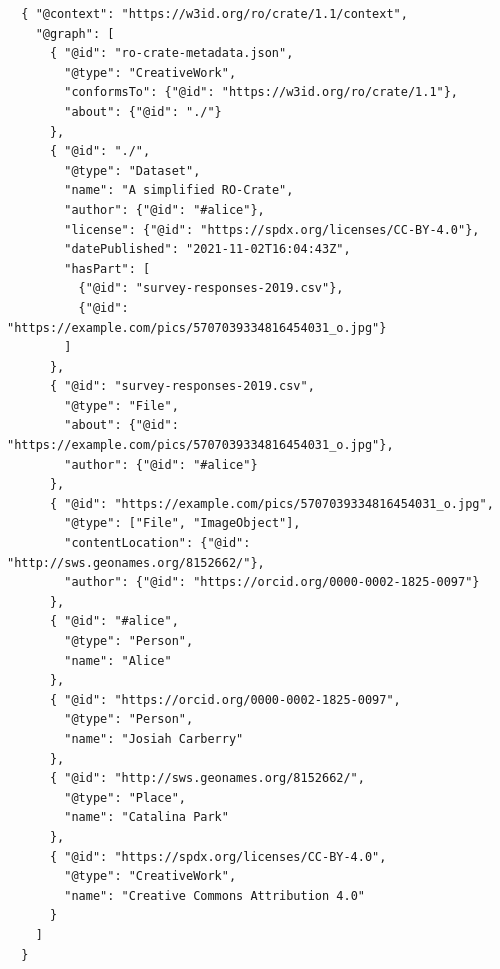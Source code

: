 \begin{listing}
  \footnotesize
  \begin{verbatim}
  { "@context": "https://w3id.org/ro/crate/1.1/context",
    "@graph": [
      { "@id": "ro-crate-metadata.json",      
        "@type": "CreativeWork",
        "conformsTo": {"@id": "https://w3id.org/ro/crate/1.1"},
        "about": {"@id": "./"}
      },
      { "@id": "./",
        "@type": "Dataset",
        "name": "A simplified RO-Crate",
        "author": {"@id": "#alice"},
        "license": {"@id": "https://spdx.org/licenses/CC-BY-4.0"},
        "datePublished": "2021-11-02T16:04:43Z",
        "hasPart": [
          {"@id": "survey-responses-2019.csv"},
          {"@id": "https://example.com/pics/5707039334816454031_o.jpg"}
        ]
      },
      { "@id": "survey-responses-2019.csv",
        "@type": "File",
        "about": {"@id": "https://example.com/pics/5707039334816454031_o.jpg"},
        "author": {"@id": "#alice"}
      },
      { "@id": "https://example.com/pics/5707039334816454031_o.jpg",
        "@type": ["File", "ImageObject"],
        "contentLocation": {"@id": "http://sws.geonames.org/8152662/"},
        "author": {"@id": "https://orcid.org/0000-0002-1825-0097"}
      },
      { "@id": "#alice",
        "@type": "Person",
        "name": "Alice"
      },
      { "@id": "https://orcid.org/0000-0002-1825-0097",
        "@type": "Person",
        "name": "Josiah Carberry"
      },
      { "@id": "http://sws.geonames.org/8152662/",
        "@type": "Place",
        "name": "Catalina Park"
      },
      { "@id": "https://spdx.org/licenses/CC-BY-4.0",
        "@type": "CreativeWork",
        "name": "Creative Commons Attribution 4.0"
      }
    ]
  }    
  \end{verbatim}    
	\caption[Simplified RO-Crate metadata file]{%
  Simplified\footnotemark RO-Crate metadata file showing the
  flattened compacted JSON-LD \texttt{@graph} array containing the data entities
  and contextual entities, cross-referenced using \texttt{@id}. The
  \texttt{ro-crate-metadata.json} entity self-declares conformance with the
  RO-Crate specification using a versioned persistent identifier, further
  RO-Crate descriptions are on the root data entity \texttt{./} or any of the
  referenced data or contextual entities. This is exemplified by the data
  entity \texttt{ImageObject} referencing contextual entities for
  \texttt{contentLocation} and \texttt{author} that differs from that of the overall
  RO-Crate. In this crate, \texttt{about} of the CSV data entity reference the
  \texttt{ImageObject}, which then take the roles of both a data entity and
  contextual entity. While \texttt{Person} entities ideally are identified with
  ORCID PIDs as for Josiah, \texttt{\#alice} is here in contrast an RO-Crate
  local identifier, highlighting the pragmatic ``just enough'' Linked
  Data approach.}
  \label{ch5:lis1}
\end{listing}
  
